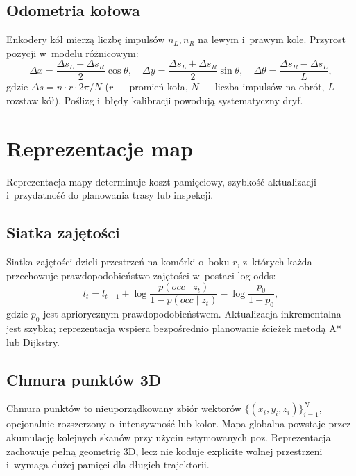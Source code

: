 \subsection{Odometria kołowa}

Enkodery kół mierzą liczbę impulsów $n_L, n_R$ na lewym i~prawym kole.
Przyrost pozycji w~modelu różnicowym:
\begin{equation}
    \Delta x = \frac{\Delta s_L + \Delta s_R}{2}\cos\theta, \quad
    \Delta y = \frac{\Delta s_L + \Delta s_R}{2}\sin\theta, \quad
    \Delta\theta = \frac{\Delta s_R - \Delta s_L}{L},
\end{equation}
gdzie $\Delta s = n \cdot r \cdot 2\pi / N$ ($r$ --- promień koła, $N$ --- liczba
impulsów na obrót, $L$ --- rozstaw kół).
Poślizg i~błędy kalibracji powodują systematyczny dryf.

\section{Reprezentacje map}

Reprezentacja mapy determinuje koszt pamięciowy, szybkość aktualizacji
i~przydatność do planowania trasy lub inspekcji.

\subsection{Siatka zajętości}

Siatka zajętości dzieli przestrzeń na komórki o~boku $r$, z~których każda
przechowuje prawdopodobieństwo zajętości w~postaci log-odds:
\begin{equation}
    l_t = l_{t-1} + \log\frac{p(occ \mid z_t)}{1 - p(occ \mid z_t)}
                 - \log\frac{p_0}{1 - p_0},
\end{equation}
gdzie $p_0$ jest apriorycznym prawdopodobieństwem.
Aktualizacja inkrementalna jest szybka; reprezentacja wspiera bezpośrednio
planowanie ścieżek metodą A* lub Dijkstry.

\subsection{Chmura punktów 3D}

Chmura punktów to nieuporządkowany zbiór wektorów $\{(x_i, y_i, z_i)\}_{i=1}^N$,
opcjonalnie rozszerzony o~intensywność lub kolor.
Mapa globalna powstaje przez akumulację kolejnych skanów przy użyciu estymowanych
poz.
Reprezentacja zachowuje pełną geometrię 3D, lecz nie koduje explicite
wolnej przestrzeni i~wymaga dużej pamięci dla długich trajektorii.

